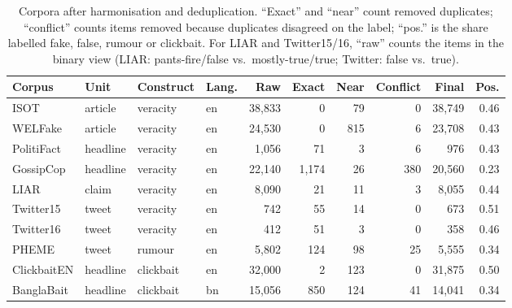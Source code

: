 \begin{table}[t]
\centering
\caption{Corpora after harmonisation and deduplication. ``Exact'' and ``near'' count removed duplicates; ``conflict'' counts items removed because duplicates disagreed on the label; ``pos.'' is the share labelled fake, false, rumour or clickbait. For LIAR and Twitter15/16, ``raw'' counts the items in the binary view (LIAR: pants-fire/false vs.\ mostly-true/true; Twitter: false vs.\ true).}\label{tab:corpora}
\small
\begin{tabular}{@{}llllrrrrrr@{}}
\toprule
Corpus & Unit & Construct & Lang. & Raw & Exact & Near & Conflict & Final & Pos. \\
\midrule
ISOT & article & veracity & en & 38{,}833 & 0 & 79 & 0 & 38{,}749 & 0.46 \\
WELFake & article & veracity & en & 24{,}530 & 0 & 815 & 6 & 23{,}708 & 0.43 \\
PolitiFact & headline & veracity & en & 1{,}056 & 71 & 3 & 6 & 976 & 0.43 \\
GossipCop & headline & veracity & en & 22{,}140 & 1{,}174 & 26 & 380 & 20{,}560 & 0.23 \\
LIAR & claim & veracity & en & 8{,}090 & 21 & 11 & 3 & 8{,}055 & 0.44 \\
Twitter15 & tweet & veracity & en & 742 & 55 & 14 & 0 & 673 & 0.51 \\
Twitter16 & tweet & veracity & en & 412 & 51 & 3 & 0 & 358 & 0.46 \\
\midrule
PHEME & tweet & rumour & en & 5{,}802 & 124 & 98 & 25 & 5{,}555 & 0.34 \\
ClickbaitEN & headline & clickbait & en & 32{,}000 & 2 & 123 & 0 & 31{,}875 & 0.50 \\
BanglaBait & headline & clickbait & bn & 15{,}056 & 850 & 124 & 41 & 14{,}041 & 0.34 \\
\bottomrule
\end{tabular}
\end{table}
